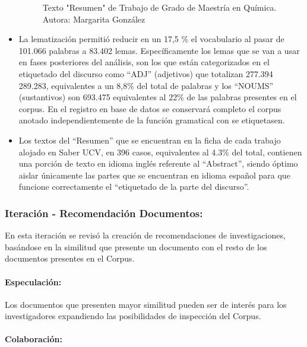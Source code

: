 \documentclass[
  12pt,
  openany]{book}
\begin{document}
\begin{itemize}
\begin{figure}
  \caption{Texto "Resumen" de Trabajo de Grado de Maestría en Química. Autora: Margarita González}\label{fig:quimica}
  \end{figure}
\item
  La lematización permitió reducir en un 17,5 \% el vocabulario al pasar de 101.066 palabras a 83.402 lemas. Específicamente los lemas que se van a usar en fases posteriores del análisis, son los que están categorizados en el etiquetado del discurso como ``ADJ'' (adjetivos) que totalizan 277.394 289.283, equivalentes a un 8,8\% del total de palabras y los ``NOUMS'' (sustantivos) son 693.475 equivalentes al 22\% de las palabras presentes en el corpus. En el registro en base de datos se conservará completo el corpus anotado independientemente de la función gramatical con se etiquetasen.
\item
  Los textos del ``Resumen'' que se encuentran en la ficha de cada trabajo alojado en Saber UCV, en 396 casos, equivalentes al 4.3\% del total, contienen una porción de texto en idioma inglés referente al ``Abstract'', siendo óptimo aislar únicamente las partes que se encuentran en idioma español para que funcione correctamente el ``etiquetado de la parte del discurso''.
\end{itemize}

\hypertarget{imrecomendacion}{%
\subsubsection{Iteración - Recomendación Documentos:}\label{imrecomendacion}}

En esta iteración se revisó la creación de recomendaciones de investigaciones, basándose en la similitud que presente un documento con el resto de los documentos presentes en el Corpus.

\hypertarget{especulaciuxf3n-5}{%
\paragraph{Especulación:}\label{especulaciuxf3n-5}}

Los documentos que presenten mayor similitud pueden ser de interés para los investigadores expandiendo las posibilidades de inspección del Corpus.

\hypertarget{colaboraciuxf3n-5}{%
\paragraph{Colaboración:}\label{colaboraciuxf3n-5}}
\end{document}
